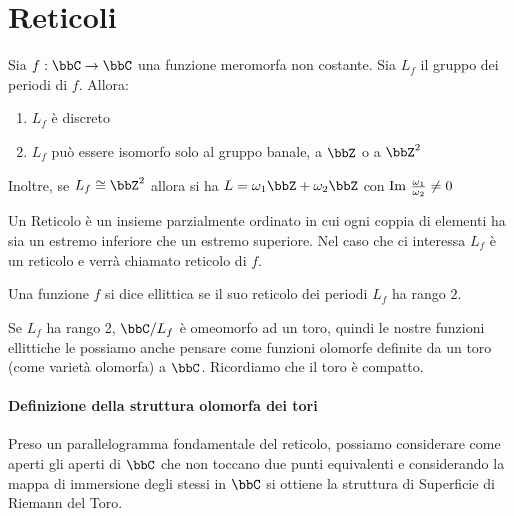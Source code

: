 \section{Reticoli}
Sia $f: \bbC \rar \bbC$ una funzione meromorfa non costante. Sia $L_f$ il gruppo dei periodi di $f$. Allora:
\begin{enumerate}
  \item $L_f$ è discreto
  \item $L_f$ può essere isomorfo solo al gruppo banale, a $\bbZ$ o a $\bbZ^2$
\end{enumerate}
Inoltre, se $L_f \cong \bbZ^2$ allora si ha $L = \omega_1 \bbZ + \omega_2 \bbZ$ con $\text{Im } \frac{\omega_1}{\omega_2} \neq 0$

\begin{definizione}[Reticolo]
  Un Reticolo è un insieme parzialmente ordinato in cui ogni coppia di elementi ha sia un estremo inferiore che un estremo superiore.
  Nel caso che ci interessa $L_f$ è un reticolo e verrà chiamato reticolo di $f$.
\end{definizione}

\begin{definizione}
  Una funzione $f$ si dice ellittica se il suo reticolo dei periodi $L_f$ ha rango $2$.
\end{definizione}

\begin{osservazione}
  Se $L_f$ ha rango 2, $\bbC / L_f$ è omeomorfo ad un toro, quindi le nostre funzioni ellittiche le possiamo anche pensare come funzioni
  olomorfe definite da un toro (come varietà olomorfa) a $\bbC$. Ricordiamo che il toro è compatto.
\end{osservazione}

\paragraph{Definizione della struttura olomorfa dei tori}
Preso un parallelogramma fondamentale del reticolo, possiamo considerare come aperti gli aperti di $\bbC$ che non toccano due punti
equivalenti e considerando la mappa di immersione degli stessi in $\bbC$ si ottiene la struttura di Superficie di Riemann del Toro.


